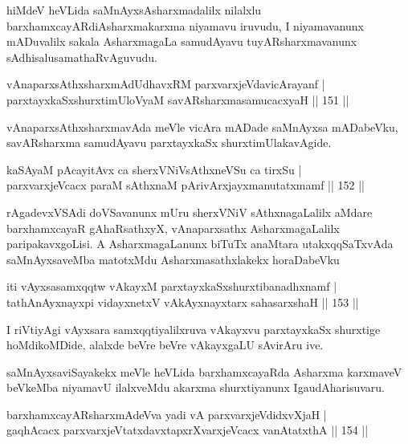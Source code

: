 \begin{artha}
hiMdeV heVLida saMnAyxsAsharxmadalilx nilalxlu barxhamxcayARdi\break Asharxmakarxma niyamavu iruvudu, I niyamavanunx mADuvalilx sakala AsharxmagaLa samudAyavu tuyARsharxmavanunx sAdhisalu\break samathaRvAguvudu.
\end{artha}

\begin{shl}
vAnaparxsAthxsharxmAdUdhavxRM parxvarxjeVdavicArayanf |\\
parxtayxkaSxshurxtimUloV\s yaM savARsharxmasamucacxyaH \hfill || 151 ||
\end{shl}

\begin{artha}
vAnaparxsAthxsharxmavAda meVle vicAra mADade saMnAyxsa mADabeVku, savARsharxma samudAyavu parxtayxkaSx shurxtimUlakavAgide.
\end{artha}


\begin{shl}
kaSAyaM pAcayitAvx ca sherxVNiVsAthxneVSu ca tirxSu |\\
parxvarxjeVcacx paraM sAthxnaM pArivArxjayxmanutatxmamf \hfill || 152 ||
\end{shl}

\begin{artha}
rAgadevxVSAdi doVSavanunx mUru sherxVNiV sAthxnagaLalilx aMdare barxhamxcayaR gAhaRsathxyX, vAnaparxsathx AsharxmagaLalilx paripakavxgoLisi. A AsharxmagaLanunx biTuTx anaMtara utakxqqSaTxvAda saMnAyxsaveMba matotxMdu Asharxmasathxlakekx horaDabeVku
\end{artha}

\begin{shl}
iti vAyxsasamxqqtw vAkayxM parxtayxkaSxshurxtibanadhxnamf |\\
tathA\s nAyxnayxpi vidayxnetxV vAkAyxnayxtarx sahasarxshaH \hfill || 153 ||
\end{shl}

\begin{artha}%
I riVtiyAgi vAyxsara samxqqtiyalilxruva vAkayxvu parxtayxkaSx shurxtige hoMdikoMDide, alalxde beVre beVre vAkayxgaLU sAvirAru ive.

saMnAyxsaviSayakekx meVle heVLida barxhamxcayaRda Asharxma karxmaveV beVkeMba niyamavU ilalxveMdu akarxma shurxtiyanunx Iga\break udAharisuvaru.
\end{artha}

\begin{shl}
barxhamxcayARsharxmAdeVva yadi vA parxvarxjeVdidxvXjaH |\\
gaqhAcacx parxvarxjeVtatxdavxtapxrXvarxjeVcacx vanAtatxthA \hfill || 154 ||
\end{shl}

